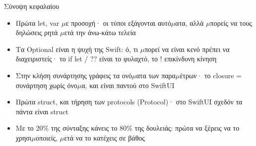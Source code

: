 \begin{tcbsummary}{Σύνοψη κεφαλαίου}
\begin{itemize}
  \item Πρώτα let, var $\mu$ε προσοχή· οι τύποι εξάγονται αυτό$\mu$ατα, αλλά $\mu$πορείς να τους δηλώσεις ρητά $\mu$ετά την άνω-κάτω τελεία
  \item Τα Optional είναι η ψυχή της Swift: ό, τι $\mu$πορεί να είναι κενό πρέπει να διαχειριστείς· το if let / ?? είναι το φυλαχτό, το ! επικίνδυνη κίνηση
  \item Στην κλήση συνάρτησης γράφεις τα ονό$\mu$ατα των παρα$\mu$έτρων· το closure = συνάρτηση χωρίς όνο$\mu$α, και είναι παντού στο SwiftUI
  \item Πρώτα struct, και τήρηση των protocols (Protocol)· στο SwiftUI σχεδόν τα πάντα είναι struct
  \item Με το 20\% της σύνταξης κάνεις το 80\% της δουλειάς: πρώτα να ξέρεις να το χρησι$\mu$οποιείς, $\mu$ετά να το κατέχεις σε βάθος
\end{itemize}

\end{tcbsummary}
